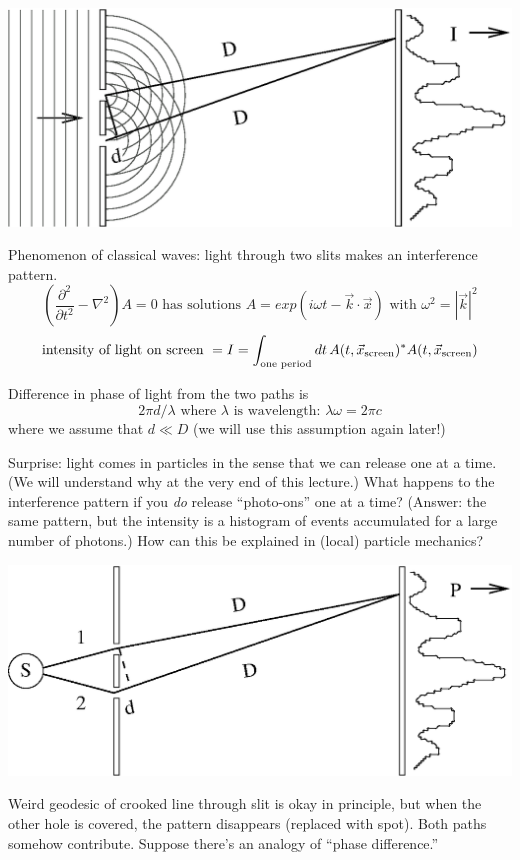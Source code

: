 \documentclass[12pt]{article}
\begin{document}
\begin{center}
  \includegraphics[width=0.6\linewidth]{fig1.eps}
\end{center}
Phenomenon of classical waves: light through two slits makes an
interference pattern.
\begin{equation}
  \left( \frac{\partial^2}{\partial t^2} - \nabla^2 \right) A = 0
  \mbox{ has solutions } A = exp(i\omega t - \vec{k} \cdot \vec{x})
  \mbox{ with } \omega^2 = |\vec{k}|^2
\end{equation}
\begin{equation}
  \mbox{intensity of light on screen } = I = \int_{\mbox{\scriptsize
  one period}} dt \, A(t, \vec{x}_{\mbox{\scriptsize screen}})^*
  A(t, \vec{x}_{\mbox{\scriptsize screen}})
\end{equation}

Difference in phase of light from the two paths is
\begin{equation}
  2 \pi d / \lambda \mbox{ where $\lambda$ is wavelength: } \lambda \omega = 2 \pi c
\end{equation}
where we assume that $d \ll D$ (we will use this assumption again later!)

Surprise: light comes in particles in the sense that we can release
one at a time.  (We will understand why at the very end of this
lecture.)  What happens to the interference pattern if you {\it do}
release ``photo-ons'' one at a time?  (Answer: the same pattern, but
the intensity is a histogram of events accumulated for a large number
of photons.)  How can this be explained in (local) particle mechanics?
\begin{center}
  \includegraphics[width=0.6\linewidth]{fig2.eps}
\end{center}

Weird geodesic of crooked line through slit is okay in principle, but
when the other hole is covered, the pattern disappears (replaced with
spot).  Both paths somehow contribute.  Suppose there's an analogy of
``phase difference.''
\end{document}
